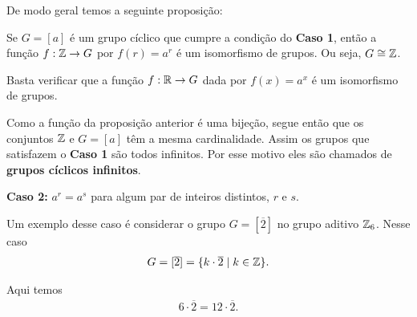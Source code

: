 De modo geral temos a seguinte proposição:

\begin{proposicao}
    Se $G = [a]$ é um grupo cíclico que cumpre a condição do \textbf{Caso 1}, então a função $f : \mathbb{Z} \to G$ por $f(r) = a^r$ é um isomorfismo de grupos. Ou seja, $G \cong \mathbb{Z}$.
\end{proposicao}
\begin{prova}
    Basta verificar que a função $f : \mathbb{R} \to G$ dada por $f(x) = a^x$ é um isomorfismo de grupos.
\end{prova}

\begin{observacao}
    Como a função da proposição anterior é uma bijeção, segue então que os conjuntos $\mathbb{Z}$ e $G = [a]$ têm a mesma cardinalidade. Assim os grupos que satisfazem o \textbf{Caso 1} são todos infinitos. Por esse motivo eles são chamados de \textbf{grupos cíclicos infinitos}.
\end{observacao}

\textbf{Caso 2:} $a^r = a^s$ para algum par de inteiros distintos, $r$ e $s$.

Um exemplo desse caso é considerar o grupo $G = [\overline{2}]$ no grupo aditivo $\mathbb{Z}_6$. Nesse caso
\begin{align*}
    G = [\overline{2}] = \{k \cdot \overline{2} \mid k \in \mathbb{Z}\}.
\end{align*}

Aqui temos
\begin{align*}
    6\cdot\overline{2} = 12\cdot \overline{2}.
\end{align*}

